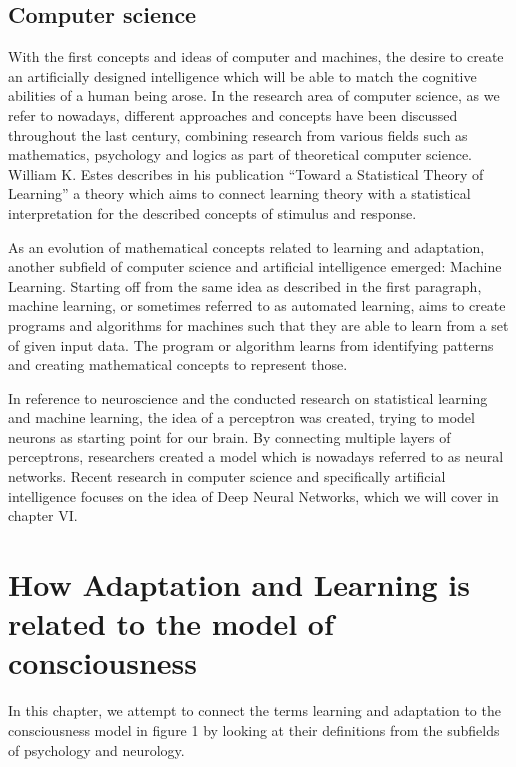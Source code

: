 \documentclass[conference]{IEEEtran}
\begin{document}
	\subsection{Computer science}\label{CS}
		With the first concepts and ideas of computer and machines, the desire to create an artificially designed intelligence which will be able to match the cognitive abilities of a human being arose. In the research area of computer science, as we refer to nowadays, different approaches and concepts have been discussed throughout the last century, combining research from various fields such as mathematics, psychology and logics as part of theoretical computer science. William K. Estes describes in his publication ``Toward a Statistical Theory of Learning'' \cite{d7} a theory which aims to connect learning theory with a statistical interpretation for the described concepts of stimulus and response.

		As an evolution of mathematical concepts related to learning and adaptation, another subfield of computer science and artificial intelligence emerged: Machine Learning. Starting off from the same idea as described in the first paragraph, machine learning, or sometimes referred to as automated learning, aims to create programs and algorithms for machines such that they are able to learn from a set of given input data. The program or algorithm learns from identifying patterns and creating mathematical concepts to represent those. \cite{d8}

		In reference to neuroscience and the conducted research on statistical learning and machine learning, the idea of a perceptron was created, trying to model neurons as starting point for our brain. By connecting multiple layers of perceptrons, researchers created a model which is nowadays referred to as neural networks. Recent research in computer science and specifically artificial intelligence focuses on the idea of Deep Neural Networks, which we will cover in chapter VI.



\section{How Adaptation and Learning is related to the model of consciousness}

	In this chapter, we attempt to connect the terms learning and adaptation to the consciousness model in figure 1 by looking at their definitions from the subfields of psychology and neurology.
\end{document}
